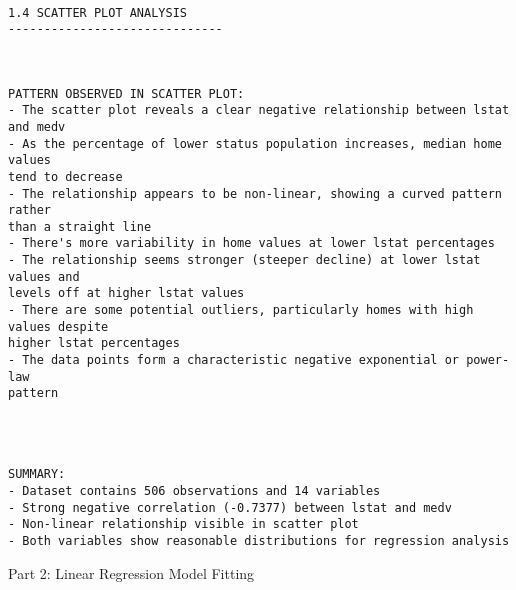 \documentclass[11pt, twocolumn]{article}
\begin{document}
    \begin{Verbatim}[commandchars=\\\{\}]

1.4 SCATTER PLOT ANALYSIS
------------------------------
    \end{Verbatim}

    \begin{center}
    \end{center}
    { \hspace*{\fill} \\}
    
    \begin{Verbatim}[commandchars=\\\{\}]
PATTERN OBSERVED IN SCATTER PLOT:
- The scatter plot reveals a clear negative relationship between lstat and medv
- As the percentage of lower status population increases, median home values
tend to decrease
- The relationship appears to be non-linear, showing a curved pattern rather
than a straight line
- There's more variability in home values at lower lstat percentages
- The relationship seems stronger (steeper decline) at lower lstat values and
levels off at higher lstat values
- There are some potential outliers, particularly homes with high values despite
higher lstat percentages
- The data points form a characteristic negative exponential or power-law
pattern
    \end{Verbatim}

    \begin{center}
    \end{center}
    { \hspace*{\fill} \\}
    
    \begin{Verbatim}[commandchars=\\\{\}]

SUMMARY:
- Dataset contains 506 observations and 14 variables
- Strong negative correlation (-0.7377) between lstat and medv
- Non-linear relationship visible in scatter plot
- Both variables show reasonable distributions for regression analysis
    \end{Verbatim}

    Part 2: Linear Regression Model Fitting
\end{document}
